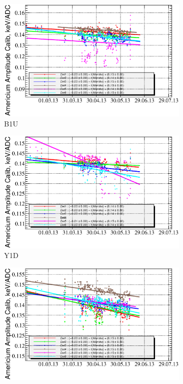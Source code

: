 \documentclass[a4paper,12pt]{article}
\begin{document}
\newcommand\amgainlabel{Americium gain ($E_{\text{Am}} / \mu_{\text{Am}}$) time dependency}
\begin{figure}[p]
\begin{subfigure}[b]{0.5\textwidth}
\includegraphics[width=\textwidth]{gfx/run13_alpha_study/B1U/c_chAmGain_by_day_B1U.eps}
\caption{B1U}
\end{subfigure}
\begin{subfigure}[b]{0.5\textwidth}
\includegraphics[width=\textwidth]{gfx/run13_alpha_study/Y1D/c_chAmGain_by_day_Y1D.eps}
\caption{Y1D}
\end{subfigure}
%
\begin{subfigure}[b]{0.5\textwidth}
\includegraphics[width=\textwidth]{gfx/run13_alpha_study/B2D/c_chAmGain_by_day_B2D.eps}

\end{subfigure}
\end{figure}
\end{document}
